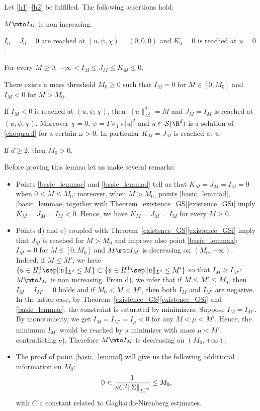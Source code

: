 \begin{lemma}\label{basic_lemma}
Let \eqref{h1}--\eqref{h2} be fulfilled. The following assertions hold:
\begin{enumeratea}
\item\label{basic_lemmaa}
$M\mto I_{M}$ is non increasing.
\item\label{basic_lemmab}
$I_{0}=J_{0}=0$ are reached at $(u,\psi,\chi)=(0,0,0)$ and $K_{0}=0$ is reached at $u=0$.
\item\label{basic_lemmac}
For every $M\geq 0$, $-\infty<I_{M}\leq J_{M}\leq K_{M}\leq 0$.
\item\label{basic_lemmad}
There exists a mass threshold $M_{0}\geq 0$ such that $I_{M}=0$ for $M\in[0,M_{0}]$ and $I_{M}<0$ for $M>M_{0}$.
\item\label{basic_lemmae}
If $I_{M}<0$ is reached at $(u,\psi,\chi)$, then $\|u\|_{L_{x}^{2}}^{2}=M$ and $J_{M}=I_{M}$ is reached at $(u,\psi,\chi)$. Moreover $\chi=0$, $\psi=\Gamma\,\sigma_{1}\star|u|^{2}$ and $u\in\mathcal{S}(\R^{d})$ is a solution of \eqref{choquard} for a certain $\omega>0$. In particular $K_{M}=J_{M}$ is reached at $u$.
\item\label{basic_lemmaf}
If $d\geq 2$, then $M_{0}>0$.
\end{enumeratea}
\end{lemma}

Before proving this lemma let us make several remarks:
\begin{itemize}
\item Points \eqref{basic_lemmac} and \eqref{basic_lemmad} tell us that $K_{M}=J_{M}=I_{M}=0$ when $0\leq M\leq M_0$;
moreover, when $M>M_0$, points \eqref{basic_lemmad}, \eqref{basic_lemmae} together
with Theorem~\ref{existence_GS}\eqref{existence_GSi} imply $K_{M}=J_{M}=I_{M}<0$.
Hence, we have $K_{M}=J_{M}=I_{M}$ for every $M\geq 0$.
\item Points d) and e) coupled with Theorem~\ref{existence_GS}\eqref{existence_GSi} imply that $J_{M}$ is reached for $M>M_{0}$ and improve also point \eqref{basic_lemmaa}: $I_{M}=0$ for $M\in[0,M_{0}]$ and
$M\mto I_{M}$ is decreasing on $(M_{0},+\infty)$.
Indeed, if $M\leq M'$, we have $\{u\in H^1_x\sep \|u\|_{L^2}\leq M\}\subset \{u\in H^1_x\sep \|u\|_{L^2}\leq M'\}$
so that $I_M\geq I_{M'}$: $M\mto I_M$ is non increasing.
From d), we infer that if $M\leq M'\leq M_0$, then $I_M=I_{M'}=0$ holds and if $M_0< M< M'$, then both $I_M$ and $I_{M'}$ are negative.
In the latter case, by Theorem~\ref{existence_GS}\eqref{existence_GSi} and \eqref{basic_lemmae}, the constraint is saturated by minimizers.
Suppose $I_M=I_{M'}$. By monotonicity, we get $I_M=I_{M'}=I_\mu<0$ for any $M<\mu<M'$. Hence, the minimum $I_{M'}$ would be reached by a minimizer with mass $\mu<M'$, contradicting e).
Therefore $M\mto I_M$ is decreasing on $(M_{0},+\infty)$.
\item The proof of point \eqref{basic_lemmaf} will give us the following additional information on $M_{0}$:
\begin{equation}\label{estimation_M1}
0<\frac{1}{\kappa C^{2}\|\Sigma\|_{L_{x}^{\sfrac{d}{2}}}}\leq M_{0},
\end{equation}
with $C$ a constant related to Gagliardo-Nirenberg estimates.
\end{itemize}

